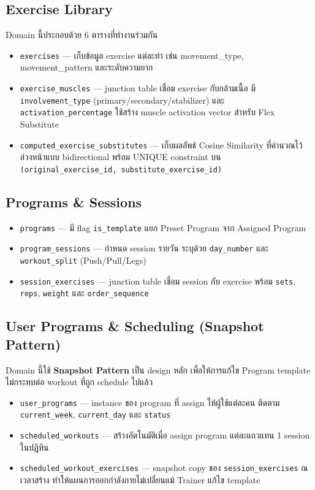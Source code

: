 \subsection{Exercise Library}
Domain นี้ประกอบด้วย 6 ตารางที่ทำงานร่วมกัน
\begin{itemize}
  \item \texttt{exercises} — เก็บข้อมูล exercise แต่ละท่า เช่น movement\_type, movement\_pattern และระดับความยาก
  \item \texttt{exercise\_muscles} — junction table เชื่อม exercise กับกล้ามเนื้อ มี \texttt{involvement\_type} (primary/secondary/stabilizer) และ \texttt{activation\_percentage} ใช้สร้าง muscle activation vector สำหรับ Flex Substitute
  \item \texttt{computed\_exercise\_substitutes} — เก็บผลลัพธ์ Cosine Similarity ที่คำนวณไว้ล่วงหน้าแบบ bidirectional พร้อม UNIQUE constraint บน \texttt{(original\_exercise\_id, substitute\_exercise\_id)}
\end{itemize}

\subsection{Programs \& Sessions}
\begin{itemize}
  \item \texttt{programs} — มี flag \texttt{is\_template} แยก Preset Program จาก Assigned Program
  \item \texttt{program\_sessions} — กำหนด session รายวัน ระบุด้วย \texttt{day\_number} และ \texttt{workout\_split} (Push/Pull/Legs)
  \item \texttt{session\_exercises} — junction table เชื่อม session กับ exercise พร้อม \texttt{sets}, \texttt{reps}, \texttt{weight} และ \texttt{order\_sequence}
\end{itemize}

\subsection{User Programs \& Scheduling (Snapshot Pattern)}
Domain นี้ใช้ \textbf{Snapshot Pattern} เป็น design หลัก เพื่อให้การแก้ไข Program template ไม่กระทบต่อ workout ที่ถูก schedule ไปแล้ว
\begin{itemize}
  \item \texttt{user\_programs} — instance ของ program ที่ assign ให้ผู้ใช้แต่ละคน ติดตาม \texttt{current\_week}, \texttt{current\_day} และ \texttt{status}
  \item \texttt{scheduled\_workouts} — สร้างอัตโนมัติเมื่อ assign program แต่ละแถวแทน 1 session ในปฏิทิน
  \item \texttt{scheduled\_workout\_exercises} — snapshot copy ของ \texttt{session\_exercises} ณ เวลาสร้าง ทำให้แผนการออกกำลังกายไม่เปลี่ยนแม้ Trainer แก้ไข template
\end{itemize}

